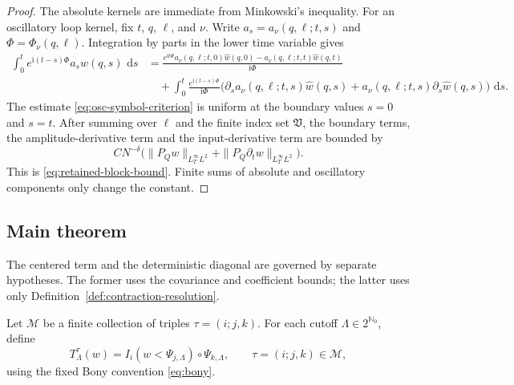\documentclass[11pt,reqno]{amsart}
\numberwithin{equation}{section}
\theoremstyle{plain}
\theoremstyle{definition}
\newcommand{\N}{\mathbb N}
\newcommand{\cM}{\mathcal M}
\newcommand{\dd}{\,\mathrm d}
\newcommand{\ii}{\mathrm i}
\begin{document}
\begin{proof}
The absolute kernels are immediate from Minkowski's inequality.  For an oscillatory loop kernel, fix \(t\), \(q\), \(\ell\), and \(\nu\).  Write \(a_s=a_\nu(q,\ell;t,s)\) and \(\Phi=\Phi_\nu(q,\ell)\).  Integration by parts in the lower time variable gives
\begin{align*}
        \int_0^t e^{\ii(t-s)\Phi}a_s\widehat w(q,s)\,\dd s
        &=\frac{e^{\ii t\Phi}a_\nu(q,\ell;t,0)\widehat w(q,0)
        -a_\nu(q,\ell;t,t)\widehat w(q,t)}{\ii\Phi}\\
        &\quad +\int_0^t\frac{e^{\ii(t-s)\Phi}}{\ii\Phi}
        \bigl(\partial_sa_\nu(q,\ell;t,s)\widehat w(q,s)
        +a_\nu(q,\ell;t,s)\partial_s\widehat w(q,s)\bigr)\,\dd s .
\end{align*}
The estimate \eqref{eq:osc-symbol-criterion} is uniform at the boundary values \(s=0\) and \(s=t\).  After summing over \(\ell\) and the finite index set \(\mathfrak V\), the boundary terms, the amplitude-derivative term and the input-derivative term are bounded by
\[
        C N^{-\delta}
        \bigl(\|P_Qw\|_{L_T^\infty L^2}+\|P_Q\partial_tw\|_{L_T^\infty L^2}\bigr).
\]
This is \eqref{eq:retained-block-bound}.  Finite sums of absolute and oscillatory components only change the constant.
\end{proof}

\subsection{Main theorem}\label{sec:main}

The centered term and the deterministic diagonal are governed by separate
hypotheses.  The former uses the covariance and coefficient bounds; the
latter uses only Definition~\ref{def:contraction-resolution}.

Let \(\cM\) be a finite collection of triples \(\tau=(i;j,k)\).  For each cutoff \(\Lambda\in2^{\N_0}\), define
\begin{equation}\label{eq:finite-operator}
        T_{\Lambda}^{\tau}(w)=I_i(w<\Psi_{j,\Lambda})\circ\Psi_{k,\Lambda},
        \qquad \tau=(i;j,k)\in\cM,
\end{equation}
using the fixed Bony convention \eqref{eq:bony}.
\end{document}
